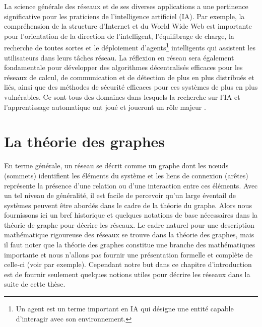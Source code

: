 La science générale des réseaux et de ses diverses applications a une pertinence significative pour les praticiens de 
l'intelligence artificiel (IA). Par exemple, la compréhension de la structure d'Internet et du World Wide Web est importante 
pour l'orientation de la direction de l'intelligent, l'équilibrage de charge, la recherche de toutes sortes et le 
déploiement d'agents\footnote{Un agent est un terme important en IA qui désigne une entité capable d’interagir avec
	son environnement.} intelligents qui assistent les utilisateurs dans leurs tâches réseau. La réflexion en
réseau sera également fondamentale pour développer des algorithmes décentralisés efficaces pour les réseaux de calcul,
de communication et de détection de plus en plus distribués et liés, ainsi que des méthodes de sécurité efficaces pour 
ces systèmes de plus en plus vulnérables. Ce sont tous des domaines dans lesquels la recherche sur l'IA et 
l'apprentissage automatique ont joué et joueront un rôle majeur \cite{Mitchell2006,Basheer-Hajmeerb2000,Passerini-al2017}.

\section{La théorie des graphes}
En terme générale, un réseau se décrit comme un graphe dont les nœuds (sommets) identifient les éléments du
système et les liens de connexion (arêtes) représente la présence d'une relation ou d'une interaction entre ces
éléments. Avec un tel niveau de généralité, il est facile de percevoir qu'un large éventail de systèmes peuvent 
être abordés dans le cadre de la théorie du graphe. Alors nous fournissons ici un bref historique et quelques 
notations de base nécessaires dans la théorie de graphe pour décrire les réseaux. Le cadre naturel pour une description
mathématique rigoureuse des réseaux se trouve dans la théorie des graphes, mais il faut noter que la théorie des graphes 
constitue une branche des mathématiques importante et nous n'allons pas fournir une présentation
formelle et complète de  celle-ci (voir \cite{Ha1995,West1996} par exemple). Cependant notre but dans ce chapitre 
d'introduction est de fournir seulement quelques notions utiles pour décrire les réseaux dans la suite de cette thèse.
